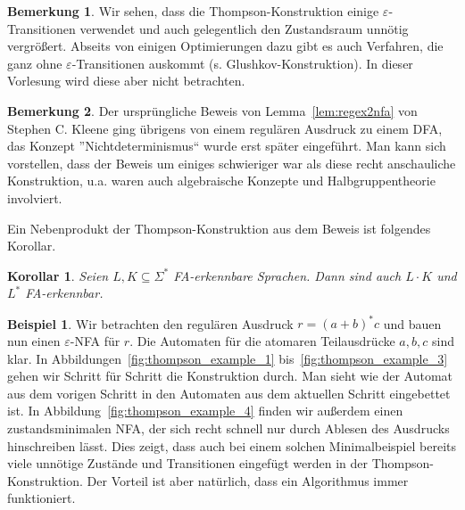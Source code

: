 \documentclass[11pt, a4paper]{article}
\theoremstyle{definition}
\newtheorem{example}[definition]{Beispiel}
\newtheorem*{remark*}{Bemerkung}
\theoremstyle{plain}
\newtheorem{corollary}[definition]{Korollar}
\numberwithin{equation}{section}
\begin{document}
\begin{remark*}
	Wir sehen, dass die Thompson-Konstruktion einige $\varepsilon$-Tran\-si\-tio\-nen verwendet und auch gelegentlich den Zustandsraum unnötig vergrößert. Abseits von einigen Optimierungen dazu gibt es auch Verfahren, die ganz ohne $\varepsilon$-Transitionen auskommt (s. Glushkov-Konstruktion). In dieser Vorlesung wird diese aber nicht betrachten.
\end{remark*}
\begin{remark*}
	Der ursprüngliche Beweis von Lemma~\ref{lem:regex2nfa} von Stephen {C.} Kleene ging übrigens von einem regulären Ausdruck zu einem DFA, das Konzept ''Nichtdeterminismus`` wurde erst später eingeführt. Man kann sich vorstellen, dass der Beweis um einiges schwieriger war als diese recht anschauliche Konstruktion, u.a. waren auch algebraische Konzepte und Halbgruppentheorie involviert.
\end{remark*}
Ein Nebenprodukt der Thompson-Konstruktion aus dem Beweis ist folgendes Korollar.
\begin{corollary}
	Seien $L, K \subseteq \Sigma^\ast$ FA-erkennbare Sprachen. Dann sind auch $L \cdot K$ und $L^\ast$ FA-erkennbar.
\end{corollary}
\begin{example}
	Wir betrachten den regulären Ausdruck $r = (a+b)^\ast c$ und bauen nun einen $\varepsilon$-NFA für $r$. Die Automaten für die atomaren Teilausdrücke $a, b, c$ sind klar. In Abbildungen~\ref{fig:thompson_example_1} bis~\ref{fig:thompson_example_3} gehen wir Schritt für Schritt die Konstruktion durch. Man sieht wie der Automat aus dem vorigen Schritt in den Automaten aus dem aktuellen Schritt eingebettet ist. In Abbildung~\ref{fig:thompson_example_4} finden wir außerdem einen zustandsminimalen NFA, der sich recht schnell nur durch Ablesen des Ausdrucks hinschreiben lässt. Dies zeigt, dass auch bei einem solchen Minimalbeispiel bereits viele unnötige Zustände und Transitionen eingefügt werden in der Thompson-Konstruktion. Der Vorteil ist aber natürlich, dass ein Algorithmus immer funktioniert.
\end{example}
\end{document}
